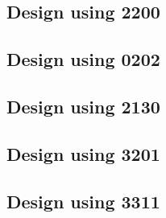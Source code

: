 \subsection{Design using 2200}


 \begin{center}




 \end{center}



\subsection{Design using 0202}


 \begin{center}




 \end{center}



\subsection{Design using 2130}


 \begin{center}




 \end{center}



\subsection{Design using 3201}


 \begin{center}




 \end{center}



\subsection{Design using 3311}


 \begin{center}




 \end{center}



